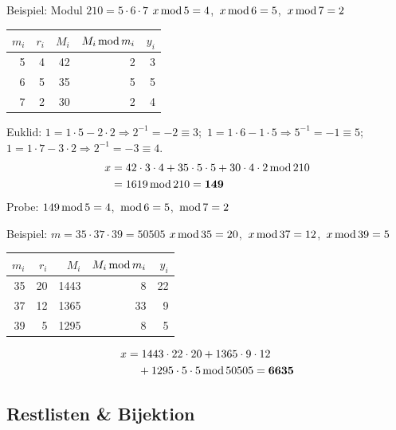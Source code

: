 \documentclass[a4paper, fontsize=7pt]{scrartcl}
\newcommand{\Mod}{\mskip3mu\mathrm{mod}\mskip3mu}
\renewcommand*{\arraystretch}{1.5}  %
\begin{document}
\begin{subbox}{Beispiel: Modul $210 = 5 \cdot 6 \cdot 7$}
$x \Mod 5 = 4$,\ $x \Mod 6 = 5$,\ $x \Mod 7 = 2$
\renewcommand*{\arraystretch}{1.1}
\begin{center}
\setlength{\tabcolsep}{4pt}
\begin{tabular}{@{}rr|rrr@{}}
$m_i$ & $r_i$ & $M_i$ & $M_i \Mod m_i$ & $y_i$ \\
\hline
5 & 4 & 42 & 2 & 3 \\
6 & 5 & 35 & 5 & 5 \\
7 & 2 & 30 & 2 & 4 \\
\end{tabular}
\end{center}
Euklid: $1 = 1\cdot 5 - 2 \cdot 2 \Rightarrow 2^{-1} = -2 \equiv 3$;\
$1 = 1 \cdot 6 - 1 \cdot 5 \Rightarrow 5^{-1} = -1 \equiv 5$;\
$1 = 1 \cdot 7 - 3 \cdot 2 \Rightarrow 2^{-1} = -3 \equiv 4$.
\begin{align*}
x &= 42\cdot3\cdot4 + 35\cdot5\cdot5 + 30\cdot4\cdot2 \Mod 210\\
  &= 1619 \Mod 210 = \mathbf{149}
\end{align*}
Probe: $149 \Mod 5 = 4$, $\Mod 6 = 5$, $\Mod 7 = 2$ \checkmark
\end{subbox}

\begin{subbox}{Beispiel: $m = 35 \cdot 37 \cdot 39 = 50505$}
$x \Mod 35 = 20$,\ $x \Mod 37 = 12$,\ $x \Mod 39 = 5$
\renewcommand*{\arraystretch}{1.1}
\begin{center}
\setlength{\tabcolsep}{4pt}
\begin{tabular}{@{}rr|rrr@{}}
$m_i$ & $r_i$ & $M_i$ & $M_i \Mod m_i$ & $y_i$ \\
\hline
35 & 20 & 1443 & 8 & 22 \\
37 & 12 & 1365 & 33 & 9 \\
39 & 5 & 1295 & 8 & 5 \\
\end{tabular}
\end{center}
\begin{align*}
x &= 1443\cdot22\cdot20 + 1365\cdot9\cdot12\\
  &\quad + 1295\cdot5\cdot5 \Mod 50505 = \mathbf{6635}
\end{align*}
\end{subbox}

\subsection{Restlisten \& Bijektion}
\end{document}
